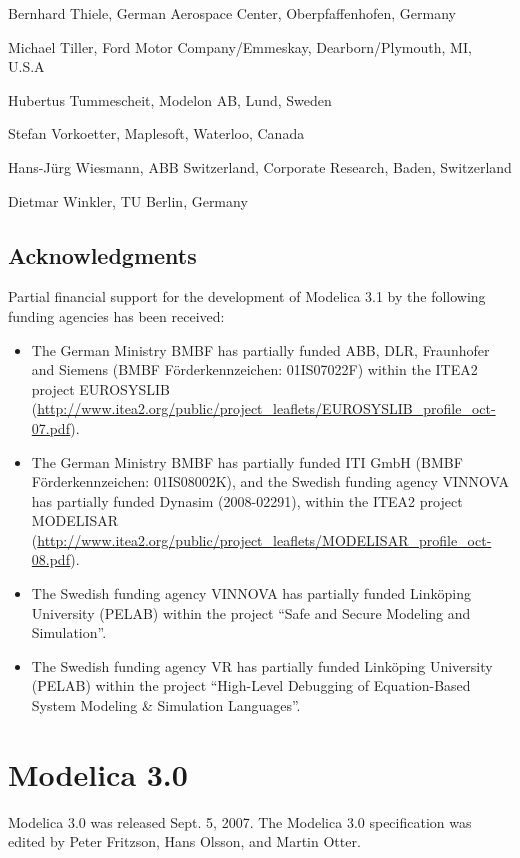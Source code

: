 \documentclass[10pt,a4paper]{report}
\def\doublelabel#1{\label{#1}\hypertarget{#1}{}}
\begin{document}
Bernhard Thiele, German Aerospace Center, Oberpfaffenhofen, Germany

Michael Tiller, Ford Motor Company/Emmeskay, Dearborn/Plymouth, MI,
U.S.A

Hubertus Tummescheit, Modelon AB, Lund, Sweden

Stefan Vorkoetter, Maplesoft, Waterloo, Canada

Hans-Jürg Wiesmann, ABB Switzerland, Corporate Research, Baden,
Switzerland

Dietmar Winkler, TU Berlin, Germany

\subsection{Acknowledgments}\doublelabel{acknowledgments3}

Partial financial support for the development of Modelica 3.1 by the
following funding agencies has been received:

\begin{itemize}
\item
  The German Ministry BMBF has partially funded ABB, DLR, Fraunhofer and
  Siemens (BMBF Förderkennzeichen: 01IS07022F) within the ITEA2 project
  EUROSYSLIB
  (\url{http://www.itea2.org/public/project_leaflets/EUROSYSLIB_profile_oct-07.pdf}).
\item
  The German Ministry BMBF has partially funded ITI GmbH (BMBF
  Förderkennzeichen: 01IS08002K), and the Swedish funding agency VINNOVA
  has partially funded Dynasim (2008-02291), within the ITEA2 project
  MODELISAR
  (\url{http://www.itea2.org/public/project_leaflets/MODELISAR_profile_oct-08.pdf}).
\item
  The Swedish funding agency VINNOVA has partially funded Linköping
  University (PELAB) within the project ``Safe and Secure Modeling and
  Simulation''.
\item
  The Swedish funding agency VR has partially funded Linköping
  University (PELAB) within the project ``High-Level Debugging of
  Equation-Based System Modeling \& Simulation Languages''.
\end{itemize}

\section{Modelica 3.0}\doublelabel{modelica-3-0}

Modelica 3.0 was released Sept. 5, 2007. The Modelica 3.0 specification
was edited by Peter Fritzson, Hans Olsson, and Martin Otter.
\end{document}
